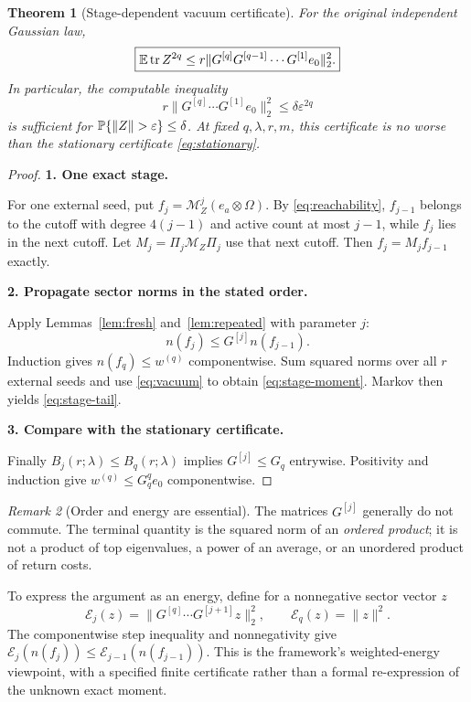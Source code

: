 \documentclass[11pt]{article}
\numberwithin{equation}{section}
\newtheorem{theorem}{Theorem}[section]
\theoremstyle{definition}\newtheorem{definition}[theorem]{Definition}
\theoremstyle{remark}\newtheorem{remark}[theorem]{Remark}
\newcommand{\tr}{\operatorname{tr}}\newcommand{\Ent}{\operatorname{Ent}}
\newcommand{\norm}[1]{\lVert#1\rVert}\newcommand{\ip}[2]{\langle#1,#2\rangle}
\newcommand{\step}[1]{\par\addvspace{.65\baselineskip}\Needspace{4\baselineskip}\noindent\textbf{#1}\par\nobreak\smallskip}
\begin{document}
\begin{theorem}[Stage-dependent vacuum certificate]\label{thm:stagewise}
For the original independent Gaussian law,
\begin{equation}\label{eq:stage-moment}
 \boxed{\E\tr Z^{2q}\le
 r\norm{G^{[q]}G^{[q-1]}\cdots G^{[1]}e_0}_2^2.}
\end{equation}
In particular, the computable inequality
\begin{equation}\label{eq:stage-tail}
 r\norm{G^{[q]}\cdots G^{[1]}e_0}_2^2\le\delta\varepsilon^{2q}
\end{equation}
is sufficient for $\Prob\{\norm Z>\varepsilon\}\le\delta$.
At fixed $q,\lambda,r,m$, this certificate is no worse than the stationary
certificate \eqref{eq:stationary}.
\end{theorem}
\begin{proof}
\step{1. One exact stage.}
For one external seed, put $f_j=\mathcal M_Z^j(e_a\otimes\Omega)$.
By \eqref{eq:reachability}, $f_{j-1}$ belongs to the cutoff with degree
$4(j-1)$ and active count at most $j-1$, while $f_j$ lies in the next cutoff.
Let $M_j=\Pi_j\mathcal M_Z\Pi_j$ use that next cutoff. Then
$f_j=M_jf_{j-1}$ exactly.

\step{2. Propagate sector norms in the stated order.}
Apply Lemmas~\ref{lem:fresh} and~\ref{lem:repeated} with parameter $j$:
\[
 n(f_j)\le G^{[j]}n(f_{j-1}).
\]
Induction gives $n(f_q)\le w^{(q)}$ componentwise. Sum squared norms over all
$r$ external seeds and use \eqref{eq:vacuum} to obtain \eqref{eq:stage-moment}.
Markov then yields \eqref{eq:stage-tail}.

\step{3. Compare with the stationary certificate.}
Finally $B_j(r;\lambda)\le B_q(r;\lambda)$ implies
$G^{[j]}\le G_q$ entrywise. Positivity and induction give
$w^{(q)}\le G_q^qe_0$ componentwise.
\end{proof}

\begin{remark}[Order and energy are essential]
The matrices $G^{[j]}$ generally do not commute. The terminal quantity is the
squared norm of an \emph{ordered product}; it is not a product of top eigenvalues,
a power of an average, or an unordered product of return costs.

To express the argument as an energy, define for a nonnegative sector vector $z$
\[
 \mathcal E_j(z)=\norm{G^{[q]}\cdots G^{[j+1]}z}_2^2,
 \qquad \mathcal E_q(z)=\norm z^2.
\]
The componentwise step inequality and nonnegativity give
$\mathcal E_j(n(f_j))\le\mathcal E_{j-1}(n(f_{j-1}))$.
This is the framework's weighted-energy viewpoint, with a specified finite
certificate rather than a formal re-expression of the unknown exact moment.
\end{remark}
\end{document}
